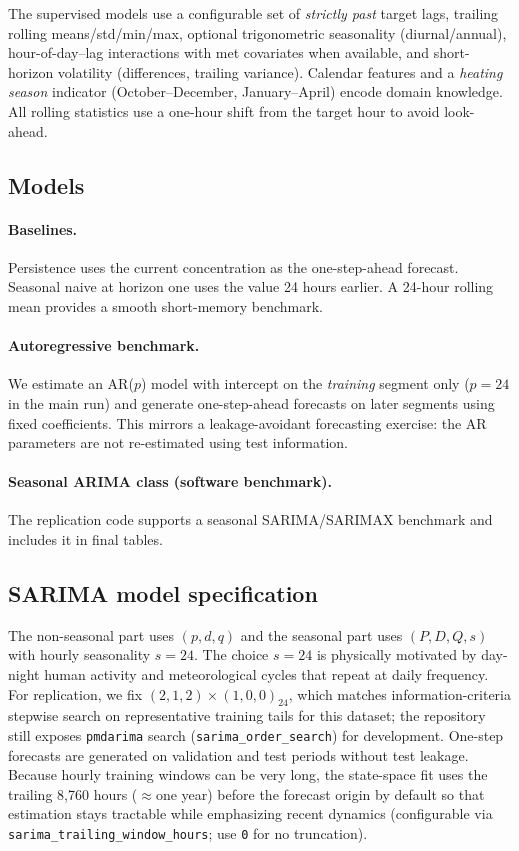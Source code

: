 \documentclass[11pt,a4paper]{article}
\begin{document}
The supervised models use a configurable set of \emph{strictly past} target lags, trailing rolling means/std/min/max, optional trigonometric seasonality (diurnal/annual), hour-of-day--lag interactions with met covariates when available, and short-horizon volatility (differences, trailing variance). Calendar features and a \emph{heating season} indicator (October--December, January--April) encode domain knowledge. All rolling statistics use a one-hour shift from the target hour to avoid look-ahead.

\subsection{Models}

\paragraph{Baselines.}
Persistence uses the current concentration as the one-step-ahead forecast. Seasonal naive at horizon one uses the value 24 hours earlier. A 24-hour rolling mean provides a smooth short-memory benchmark.

\paragraph{Autoregressive benchmark.}
We estimate an AR($p$) model with intercept on the \emph{training} segment only ($p=24$ in the main run) and generate one-step-ahead forecasts on later segments using fixed coefficients. This mirrors a leakage-avoidant forecasting exercise: the AR parameters are not re-estimated using test information.

\paragraph{Seasonal ARIMA class (software benchmark).}
The replication code supports a seasonal SARIMA/SARIMAX benchmark and includes it in final tables.

\subsection{SARIMA model specification}

The non-seasonal part uses $(p,d,q)$ and the seasonal part uses $(P,D,Q,s)$ with hourly seasonality $s=24$. The choice $s=24$ is physically motivated by day-night human activity and meteorological cycles that repeat at daily frequency. For replication, we fix $(2,1,2)\times(1,0,0)_{24}$, which matches information-criteria stepwise search on representative training tails for this dataset; the repository still exposes \texttt{pmdarima} search (\texttt{sarima\_order\_search}) for development. One-step forecasts are generated on validation and test periods without test leakage. Because hourly training windows can be very long, the state-space fit uses the trailing 8{,}760 hours ($\approx$one year) before the forecast origin by default so that estimation stays tractable while emphasizing recent dynamics (configurable via \texttt{sarima\_trailing\_window\_hours}; use \texttt{0} for no truncation).
\end{document}
